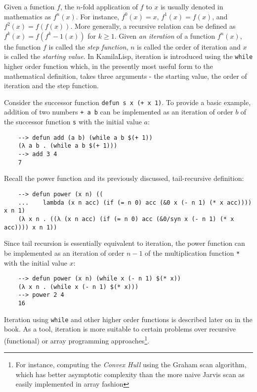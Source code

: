 Given a function $f$, the $n$-fold application of $f$ to $x$ is usually denoted in mathematics as $f^n(x)$. For instance, $f^0(x) = x$, $f^1(x) = f(x)$, and $f^2(x) = f(f(x))$. More generally, a recursive relation can be defined as $f^k(x) = f(f^k-1(x))$ for $k \ge 1$. Given \textit{an iteration} of a function $f^n(x)$, the function $f$ is called the \textit{step function}, $n$ is called the order of iteration and $x$ is called the \textit{starting value}. In KamilaLisp, iteration is introduced using the \verb|while| higher order function which, in the presently most useful form to the mathematical definition, takes three arguments - the starting value, the order of iteration and the step function.

Consider the successor function \verb|defun s x (+ x 1)|. To provide a basic example, addition of two numbers \verb|+ a b| can be implemented as an iteration of order $b$ of the successor function \verb|s| with the initial value $a$:

\begin{Verbatim}
    --> defun add (a b) (while a b $(+ 1))
    (λ a b . (while a b $(+ 1)))
    --> add 3 4
    7
\end{Verbatim}

Recall the power function and its previously discussed, tail-recursive definition:

\begin{Verbatim}
    --> defun power (x n) ((
    ...    lambda (x n acc) (if (= n 0) acc (&0 x (- n 1) (* x acc)))) x n 1)
    (λ x n . ((λ (x n acc) (if (= n 0) acc (&0/syn x (- n 1) (* x acc)))) x n 1))
\end{Verbatim}

Since tail recursion is essentially equivalent to iteration, the power function can be implemented as an iteration of order $n-1$ of the multiplication function \verb|*| with the initial value $x$:

\begin{Verbatim}
    --> defun power (x n) (while x (- n 1) $(* x))
    (λ x n . (while x (- n 1) $(* x)))
    --> power 2 4
    16
\end{Verbatim}

Iteration using \verb|while| and other higher order functions is described later on in the book. As a tool, iteration is more suitable to certain problems over recursive (functional) or array programming approaches\footnote{For instance, computing the \textit{Convex Hull} using the Graham scan algorithm, which has better asymptotic complexity than the more naive Jarvis scan as easily implemented in array fashion}.

